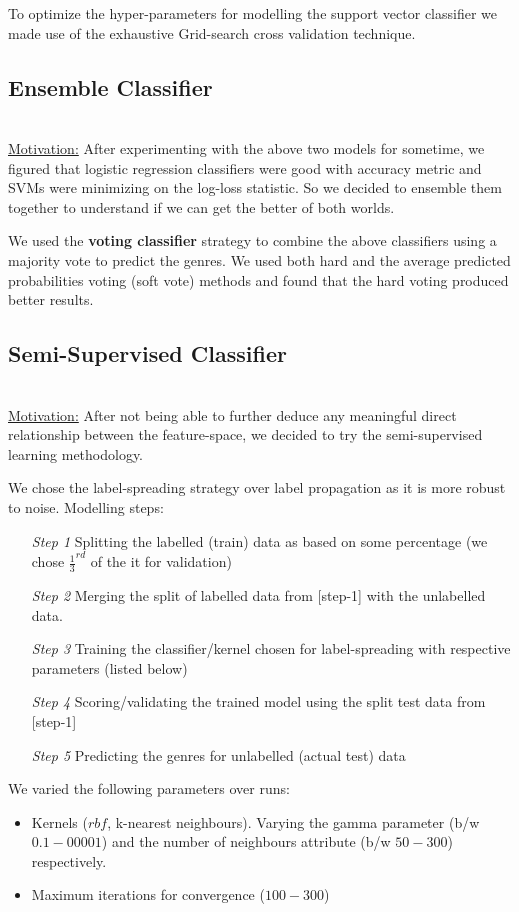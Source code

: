 \documentclass[fleqn,10pt]{SelfArx} %
\begin{document}
To optimize the hyper-parameters for modelling the support vector classifier we made use of the exhaustive Grid-search cross validation technique.
\subsection{Ensemble Classifier}~\\
\underline{Motivation:} After experimenting with the above two models for sometime, we figured that logistic regression classifiers were good with accuracy metric and SVMs were minimizing on the log-loss statistic. So we decided to ensemble them together to understand if we can get the better of both worlds.

We used the \textbf{voting classifier} strategy to combine the above classifiers using a majority vote to predict the genres. We used both hard and the average predicted probabilities voting (soft vote) methods and found that the hard voting produced better results.

\subsection{Semi-Supervised Classifier}~\\

\underline{Motivation:} After not being able to further deduce any meaningful direct relationship between the feature-space, we decided to try the semi-supervised learning methodology.

We chose the label-spreading strategy over label propagation as it is more robust to noise{\cite{label-spreading}}. Modelling steps:
\begin{itemize}
	\item[\textit{Step 1}] Splitting the labelled (train) data as based on some percentage (we chose $\frac{1}{3}^{rd}$ of the it for validation)
	\item[\textit{Step 2}] Merging the split of labelled data from [step-1] with the unlabelled data.
	\item[\textit{Step 3}] Training the classifier/kernel chosen for label-spreading with respective parameters (listed below)
	\item[\textit{Step 4}] Scoring/validating the trained model using the split test data from [step-1]
	\item[\textit{Step 5}] Predicting the genres for unlabelled (actual test) data
\end{itemize}

We varied the following parameters over runs:
\begin{itemize}
	\item Kernels ($rbf$, k-nearest neighbours). Varying the gamma parameter (b/w $0.1-00001$) and the number of neighbours attribute (b/w $50-300$) respectively.
	\item Maximum iterations for convergence ($100-300$)
\end{itemize}
\end{document}
